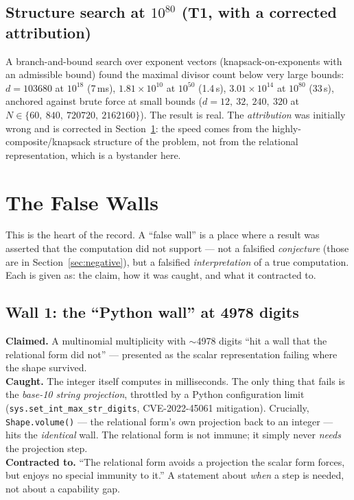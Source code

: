 \documentclass[11pt,a4paper]{article}
\newcommand{\TT}{\textsf{T1}}
\theoremstyle{definition}
\theoremstyle{plain}
\begin{document}
\subsection{Structure search at $10^{80}$ (\TT, with a corrected attribution)}
A branch-and-bound search over exponent vectors (knapsack-on-exponents with an admissible bound)
found the maximal divisor count below very large bounds: $d=103680$ at $10^{18}$ (7\,ms),
$1.81\times10^{10}$ at $10^{50}$ (1.4\,s), $3.01\times10^{14}$ at $10^{80}$ (33\,s), anchored
against brute force at small bounds ($d=12,\ 32,\ 240,\ 320$ at $N \in \{60,\ 840,\ 720720,\ 2162160\}$). The
result is real. The \emph{attribution} was initially wrong and is corrected in
Section~\ref{sec:walls}: the speed comes from the highly-composite/knapsack structure of the
problem, not from the relational representation, which is a bystander here.

\section{The False Walls}\label{sec:walls}

This is the heart of the record. A ``false wall'' is a place where a result was asserted that the
computation did not support --- not a falsified \emph{conjecture} (those are in
Section~\ref{sec:negative}), but a falsified \emph{interpretation} of a true computation. Each is
given as: the claim, how it was caught, and what it contracted to.

\subsection{Wall 1: the ``Python wall'' at 4978 digits}
\textbf{Claimed.} A multinomial multiplicity with $\sim$4978 digits ``hit a wall that the
relational form did not'' --- presented as the scalar representation failing where the shape
survived.\\
\textbf{Caught.} The integer itself computes in milliseconds. The only thing that fails is the
\emph{base-10 string projection}, throttled by a Python configuration limit
(\nolinkurl{sys.set_int_max_str_digits}, CVE-2022-45061 mitigation). Crucially,
\texttt{Shape.volume()} --- the relational form's own projection back to an integer --- hits the
\emph{identical} wall. The relational form is not immune; it simply never \emph{needs} the
projection step.\\
\textbf{Contracted to.} ``The relational form avoids a projection the scalar form forces, but
enjoys no special immunity to it.'' A statement about \emph{when} a step is needed, not about a
capability gap.
\end{document}
